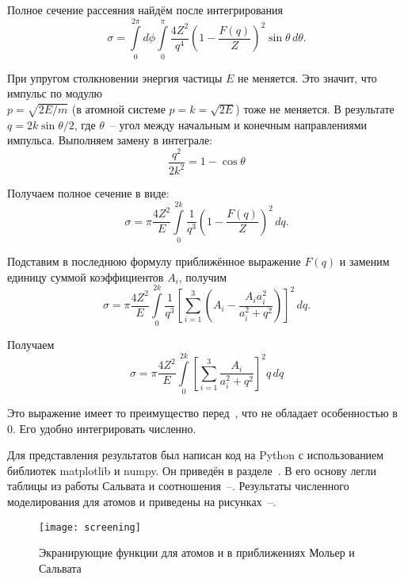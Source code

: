   Полное сечение рассеяния найдём после интегрирования
  \begin{equation}
    \sigma = \int\limits_0^{2\pi} d\phi \int\limits_0^\pi \frac{4Z^2}{q^4}
      \left( 1 - \frac{F(q)}{Z} \right)^2 \sin\theta\,d\theta.
  \end{equation}

  При упругом столкновении энергия частицы \( E \) не меняется. Это
  значит, что импульс по модулю \\ \( p = \sqrt{2E/m} \) (в атомной системе
  \( p = k = \sqrt{2E} \)) тоже не меняется. В результате
  \( q = 2 k \sin \theta / 2\), где \( \theta \)~-- угол между начальным и
  конечным направлениями импульса. Выполняем замену в интеграле:
  \[
    \frac{q^2}{2k^2} = 1-\cos \theta
  \]

  Получаем полное сечение в виде:
  \begin{equation}
    \sigma = \pi \frac{4Z^2}{E} \int\limits_0^{2k} \frac{1}{q^3}
      \left( 1 - \frac{F(q)}{Z} \right)^2\,dq.
    \label{eq:full}
  \end{equation}

  Подставим в последнюю формулу приближённое выражение \( F(q) \)
  и заменим единицу суммой коэффициентов \( A_i \), получим
  \[
    \sigma = \pi \frac{4Z^2}{E} \int\limits_0^{2k} \frac{1}{q^3}
      \left[ \sum_{i = 1}^3 \left( A_i - \frac{A_ia_i^2}{a_i^2 + q^2} \right)
      \right]^2\,dq.
  \]

  Получаем
  \begin{equation}
    \sigma = \pi \frac{4Z^2}{E} \int\limits_0^{2k}
      \left[ \sum_{i = 1}^3 \frac{A_i}{a_i^2 + q^2}  \right]^2 q\,dq
    \label{eq:sect}
  \end{equation}

  Это выражение имеет то преимущество перед~, что
  не обладает особенностью в 0. Его удобно интегрировать
  численно.

  Для представления результатов был написан код на Python с использованием
  библиотек matplotlib и numpy. Он приведён в разделе~.
  В его основу легли таблицы из работы Сальвата и
  соотношения~--. Результаты численного
  моделирования для атомов \seat и \fiat приведены на
  рисунках~--.

  \begin{figure}[h!]
    \centering
    \texttt{[image: screening]}
    \caption{Экранирующие функции для атомов \fiat и
      \seat в приближениях Мольер и Сальвата}
    \label{fig:screening}
    \end{figure}

